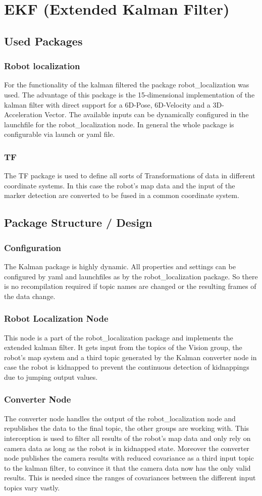 \chapter{EKF (Extended Kalman Filter)}
\section{Used Packages}
\subsection{Robot localization}
For the functionality of the kalman filtered the package robot\_localization was used. The advantage of this package is the 15-dimensional implementation of the kalman filter with direct support for a 6D-Pose, 6D-Velocity and a 3D-Acceleration Vector. The available inputs can be dynamically configured in the launchfile for the robot\_localization node. In general the whole package is configurable via launch or yaml file.
\subsection{TF}
The TF package is used to define all sorts of Transformations of data in different coordinate systems. In this case the robot's map data and the input of the marker detection are converted to be fused in a common coordinate system. 
\section{Package Structure / Design}
\subsection{Configuration}
The Kalman package is highly dynamic. All properties and settings can be configured by yaml and launchfiles as by the robot\_localization package. So there is no recompilation required if topic names are changed or the resulting frames of the data change.
\subsection{Robot Localization Node}
This node is a part of the robot\_localization package and implements the extended kalman filter. It gets input from the topics of the Vision group, the robot's map system and a third topic generated by the Kalman converter node in case the robot is kidnapped to prevent the continuous detection of kidnappings due to jumping output values.
\subsection{Converter Node}
The converter node handles the output of the robot\_localization node and republishes the data to the final topic, the other groups are working with. This interception is used to filter all results of the robot's map data and only rely on camera data as long as the robot is in kidnapped state. Moreover the converter node publishes the camera results with reduced covariance as a third input topic to the kalman filter, to convince it that the camera data now has the only valid results. This is needed since the ranges of covariances between the different input topics vary vastly.
